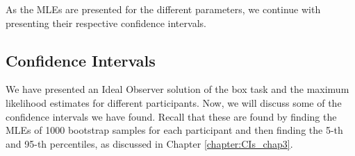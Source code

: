 As the MLEs are presented for the different parameters, we continue with presenting their respective confidence intervals. 







\subsection{Confidence Intervals}
\label{chapter:results_cis}
We have presented an Ideal Observer solution of the box task and the maximum likelihood estimates for different participants. Now, we will discuss some of the confidence intervals we have found. Recall that these are found by finding the MLEs of 1000 bootstrap samples for each participant and then finding the 5-th and 95-th percentiles, as discussed in Chapter \ref{chapter:CIs_chap3}. 

